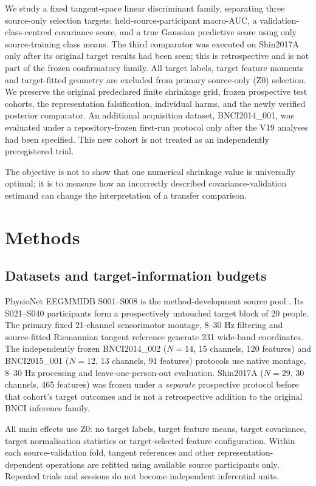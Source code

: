 \documentclass[11pt,a4paper]{article}
\begin{document}
We study a fixed tangent-space linear discriminant family, separating
three source-only selection targets: held-source-participant
macro-AUC, a validation-class-centred covariance score, and a true
Gaussian predictive score using only source-training class means.
The third comparator was executed on Shin2017A only after its original
target results had been seen; this is retrospective and is not part of
the frozen confirmatory family. All target labels, target feature
moments and target-fitted geometry are excluded from primary source-only
(Z0) selection. We preserve the original predeclared finite shrinkage grid,
frozen prospective test cohorts, the representation falsification,
individual harms, and the newly verified posterior comparator. An additional acquisition dataset, BNCI2014\_001, was evaluated
under a repository-frozen first-run protocol only after the V19
analyses had been specified. This new cohort is not treated as
an independently preregistered trial.

The objective is not to show
that one numerical shrinkage value is universally optimal; it is to measure
how an incorrectly described covariance-validation estimand can change
the interpretation of a transfer comparison.



\section{Methods}
\subsection{Datasets and target-information budgets}
PhysioNet EEGMMIDB S001--S008 is the method-development source pool
\cite{schalk2009eegmmidb,schalk2004bci2000}.
Its S021--S040 participants form a prospectively untouched target block
of 20 people. The primary fixed 21-channel sensorimotor montage, 8--30 Hz
filtering and source-fitted Riemannian tangent reference generate 231
wide-band coordinates. The independently frozen BNCI2014\_002
(\(N=14\), 15 channels, 120 features) and BNCI2015\_001
(\(N=12\), 13 channels, 91 features) protocols use native montage,
8--30 Hz processing and leave-one-person-out evaluation. Shin2017A
(\(N=29\), 30 channels, 465 features) was frozen under a \emph{separate}
prospective protocol before that cohort's target outcomes and is not a
retrospective addition to the original BNCI inference family.

All main effects use Z0: no target labels, target feature means, target
covariance, target normalisation statistics or target-selected feature
configuration. Within each source-validation fold, tangent references and
other representation-dependent operations are refitted using available
source participants only. Repeated trials and sessions do not become
independent inferential units.
\end{document}
